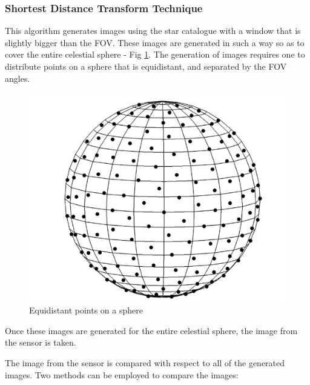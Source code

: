 \documentclass[../../main.tex]{subfiles}
\begin{document}
\subsubsection{Shortest Distance Transform Technique}

This algorithm \cite{delabie2013highly} generates images using the star catalogue with a window that is slightly bigger than the FOV. These images are generated in such a way so as to cover the entire celestial sphere - Fig \ref{fig:sphere}. 
The generation of images requires one to distribute points on a sphere that is equidistant, and separated by the FOV angles.

\begin{figure}[h]
    \centering
    \includegraphics[scale = 0.25]{Figures/GNC/shortest_dist_sphere.png}
    \caption{Equidistant points on a sphere}
    \label{fig:sphere}
\end{figure}
Once these images are generated for the entire celestial sphere, the image from the sensor is taken.

The image from the sensor is compared with respect to all of the generated images. Two methods can be employed to compare the images:
\end{document}
